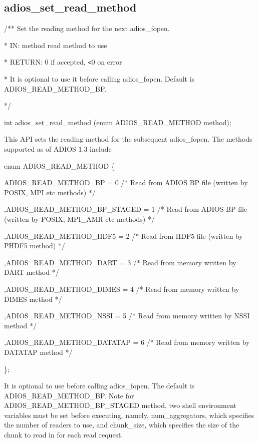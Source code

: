 \subsection{adios\_set\_read\_method}

/** Set the reading method for the next adios\_fopen.

\parindent=3pt
*  IN:  method   read method to use

*  RETURN:       0 if accepted, \texttt{<}0 on error

\parindent=7pt
*  It is optional to use it before calling adios\_fopen. Default is ADIOS\_READ\_METHOD\_BP.

\parindent=3pt
*/

\parindent=0pt
int adios\_set\_read\_method (enum ADIOS\_READ\_METHOD method);

This API sets the reading method for the subsequent adios\_fopen. The methods supported 
as of ADIOS 1.3 include

enum ADIOS\_READ\_METHOD \{

\parindent=32pt
ADIOS\_READ\_METHOD\_BP = 0    /* Read from ADIOS BP file (written by POSIX, MPI 
etc methods) */

\parindent=28pt
,ADIOS\_READ\_METHOD\_BP\_STAGED = 1    /* Read from ADIOS BP file (written by 
POSIX, MPI\_AMR etc methods) */

,ADIOS\_READ\_METHOD\_HDF5 = 2    /* Read from HDF5 file (written by PHDF5 method) 
              */

\parindent=57pt
,ADIOS\_READ\_METHOD\_DART = 3    /* Read from memory written by DART method   
                  */

\parindent=28pt
,ADIOS\_READ\_METHOD\_DIMES = 4    /* Read from memory written by DIMES method 
                   */

,ADIOS\_READ\_METHOD\_NSSI = 5    /* Read from memory written by NSSI method   
                  */

\parindent=57pt
,ADIOS\_READ\_METHOD\_DATATAP = 6    /* Read from memory written by DATATAP method 
                 */

\parindent=0pt
\};

It is optional to use before calling adios\_fopen. The default is ADIOS\_READ\_METHOD\_BP. 
Note for ADIOS\_READ\_METHOD\_BP\_STAGED method, two shell environment variables 
must be set before executing, namely, num\_aggregators, which specifies the number 
of readers to use, and chunk\_size, which specifies the size of the chunk to read 
in for each read request.

